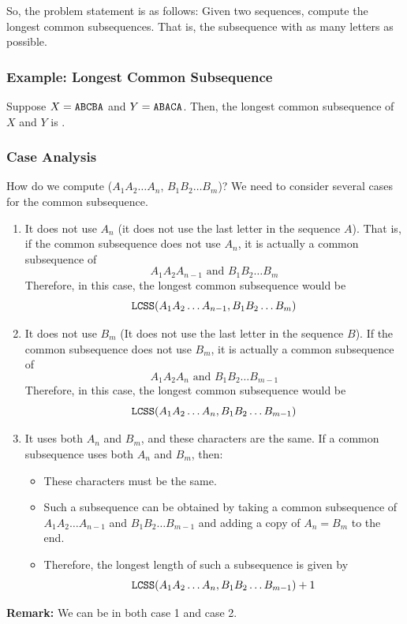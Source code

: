 \documentclass[letterpaper]{article}
\begin{document}
\bigskip 

So, the problem statement is as follows: Given two sequences, compute the longest common subsequences. That is, the subsequence with as many letters as possible. 

\subsubsection{Example: Longest Common Subsequence}
Suppose $X = \texttt{ABCBA}$ and $Y = \texttt{ABACA}$. Then, the longest common subsequence of $X$ and $Y$ is .

\subsubsection{Case Analysis}
How do we compute ($A_1 A_2 \dots A_n$, $B_1 B_2 \dots B_m$)? We need to consider several cases for the common subsequence. 
\begin{enumerate}
    \item It does not use $A_n$ (it does not use the last letter in the sequence $A$). That is, if the common subsequence does not use $A_n$, it is actually a common subsequence of 
    \[A_1 A_2 A_{n - 1} \text{ and } B_1 B_2 \dots B_m\]
    Therefore, in this case, the longest common subsequence would be 
    \[\texttt{LCSS}(A_1 A_2 \dots A_{n - 1}, B_1 B_2 \dots B_m)\]


    \item It does not use $B_m$ (It does not use the last letter in the sequence $B$). If the common subsequence does not use $B_m$, it is actually a common subsequence of 
    \[A_1 A_2 A_n \text{ and } B_1 B_2 \dots B_{m - 1}\]
    Therefore, in this case, the longest common subsequence would be 
    \[\texttt{LCSS}(A_1 A_2 \dots A_n, B_1 B_2 \dots B_{m - 1})\]

    
    \item It uses both $A_n$ and $B_m$, and these characters are the same. If a common subsequence uses both $A_n$ and $B_m$, then:
    \begin{itemize}
        \item These characters must be the same.
        \item Such a subsequence can be obtained by taking a common subsequence of $A_1 A_2 \dots A_{n - 1}$ and $B_1 B_2 \dots B_{m - 1}$ and adding a copy of $A_n = B_m$ to the end. 
        \item Therefore, the longest length of such a subsequence is given by 
        \[\texttt{LCSS}(A_1 A_2 \dots A_n, B_1 B_2 \dots B_{m - 1}) + 1\]
    \end{itemize}
\end{enumerate}
\textbf{Remark:} We can be in both case 1 and case 2.
\end{document}
